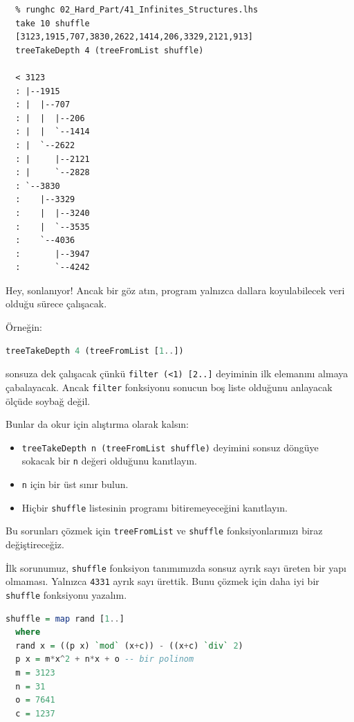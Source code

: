 \documentclass[a4paper,14pt,openany]{extbook} %
\providecommand{\tightlist}{%
  \setlength{\itemsep}{0pt}\setlength{\parskip}{0pt}}
\begin{document}
\begin{lstlisting}
  % runghc 02_Hard_Part/41_Infinites_Structures.lhs
  take 10 shuffle
  [3123,1915,707,3830,2622,1414,206,3329,2121,913]
  treeTakeDepth 4 (treeFromList shuffle)

  < 3123
  : |--1915
  : |  |--707
  : |  |  |--206
  : |  |  `--1414
  : |  `--2622
  : |     |--2121
  : |     `--2828
  : `--3830
  :    |--3329
  :    |  |--3240
  :    |  `--3535
  :    `--4036
  :       |--3947
  :       `--4242
\end{lstlisting}

Hey, sonlanıyor! Ancak bir göz atın, program yalnızca dallara koyulabilecek veri
olduğu sürece çalışacak.

Örneğin:

\begin{lstlisting}[language=Haskell]
  treeTakeDepth 4 (treeFromList [1..])
\end{lstlisting}

sonsuza dek çalışacak çünkü \lstinline!filter (<1) [2..]! deyiminin
ilk elemanını almaya çabalayacak. Ancak \lstinline!filter! fonksiyonu
sonucun boş liste olduğunu anlayacak ölçüde soybağ değil.

Bunlar da okur için alıştırma olarak kalsın:

\begin{itemize}
  \tightlist
\item
  \lstinline!treeTakeDepth n (treeFromList shuffle)! deyimini sonsuz
  döngüye sokacak bir \lstinline!n! değeri olduğunu kanıtlayın.
\item
  \lstinline!n! için bir üst sınır bulun.
\item
  Hiçbir \lstinline!shuffle! listesinin programı bitiremeyeceğini
  kanıtlayın.
\end{itemize}

Bu sorunları çözmek için \lstinline!treeFromList! ve \lstinline!shuffle!
fonksiyonlarımızı biraz değiştireceğiz.

İlk sorunumuz, \lstinline!shuffle! fonksiyon tanımımızda sonsuz ayrık
sayı üreten bir yapı olmaması. Yalnızca \lstinline!4331! ayrık sayı
ürettik. Bunu çözmek için daha iyi bir \lstinline!shuffle! fonksiyonu
yazalım.

\begin{lstlisting}[language=Haskell]
  shuffle = map rand [1..]
  where
  rand x = ((p x) `mod` (x+c)) - ((x+c) `div` 2)
  p x = m*x^2 + n*x + o -- bir polinom
  m = 3123
  n = 31
  o = 7641
  c = 1237
\end{lstlisting}
\end{document}
